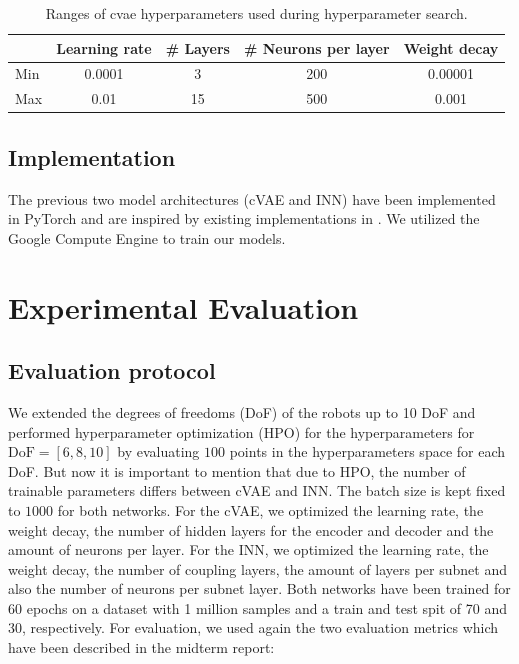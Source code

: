 \documentclass[conference]{IEEEtran}
\begin{document}
\begin{table}[h]
    \caption{Ranges of cvae hyperparameters used during hyperparameter search.}
    \label{tab:hyperparameter-ranges-cvae}
    \centering
    \begin{tabular}{|l|c|c|c|c|}
    \hline
      & Learning rate & \# Layers & \# Neurons per layer & Weight decay \\
     \hline
     Min  & 0.0001 & 3 & 200 & 0.00001 \\
     Max  & 0.01 & 15 & 500 & 0.001 \\
     \hline
    \end{tabular}
\end{table}

\subsection*{Implementation}

The previous two model architectures (cVAE and INN) have been implemented in PyTorch and are inspired by existing implementations in  \cite{graviraja2019, freia2020}. We utilized the Google Compute Engine to train our models.

\section*{Experimental Evaluation}

\subsection*{Evaluation protocol}

We extended the degrees of freedoms (DoF) of the robots up to 10 DoF and performed hyperparameter optimization (HPO) for the hyperparameters for $ \text{DoF} = [6, 8, 10]$ by evaluating $100$ points in the hyperparameters space for each DoF. But now it is important to mention that due to HPO, the number of trainable parameters differs between cVAE and INN. The batch size is kept fixed to $1000$ for both networks.
For the cVAE, we optimized the learning rate, the weight decay, the number of hidden layers for the encoder and decoder and the amount of neurons per layer. For the INN, we optimized the learning rate, the weight decay, the number of coupling layers, the amount of layers per subnet and also the number of neurons per subnet layer.
Both networks have been trained for 60 epochs on a dataset with 1 million samples and a train and test spit of 70 and 30, respectively. For evaluation, we used again the two evaluation metrics which have been described in the midterm report:
\end{document}
